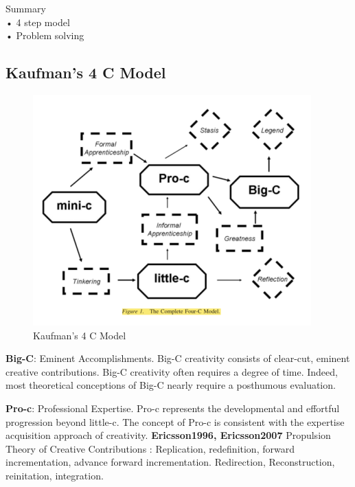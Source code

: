 \begin{shaded}
  Summary\\
  •	4 step model\\
  •	Problem solving
\end{shaded}

\subsection{Kaufman's 4 C Model}

\begin{figure}[htb] %
  \centering
  \includegraphics[width=\linewidth]{images/4C.png}
\caption[Kaufman's 4 C Model]{Kaufman's 4 C Model}
\label{fig:4C}
\end{figure}

\citep{Kaufman2009}

\textbf{Big-C}: Eminent Accomplishments. Big-C creativity consists of clear-cut, eminent creative contributions. Big-C creativity often requires a degree of time. Indeed, most theoretical conceptions of Big-C nearly require a posthumous evaluation.

\textbf{Pro-c}: Professional Expertise. Pro-c represents the developmental and effortful progression beyond little-c. The concept of Pro-c is consistent with the expertise acquisition approach of creativity. \textbf{Ericsson1996, Ericsson2007} Propulsion Theory of Creative Contributions \citep{Sternberg1999,Sternberg2006}: Replication, redefinition, forward incrementation, advance forward incrementation. Redirection, Reconstruction, reinitation, integration.

